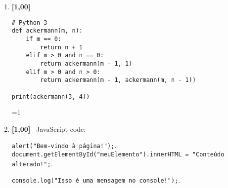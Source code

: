 \documentclass[a4paper]{article}
\newcommand{\gabarito}          {0}     %
\newcommand{\pt}                {1,00}  %
\newcommand{\ponto}[1]          {\textbf{[#1]}~}
\begin{document}
\fontsize{9pt}{9pt}\selectfont


\headerP



\begin{adjmulticols}{2}{0pt}{0pt}\raggedcolumns
  
  
\begin{enumerate}[resume=*questions,label={\arabic*.},leftmargin=*]
  \setcounter{rtaskno}{0} %
        
   
  \item \rtask \ponto{\pt} \lipsum[1][1-1]
  
\begin{lstlisting}[style=Python]
# Python 3
def ackermann(m, n):
    if m == 0:
        return n + 1
    elif m > 0 and n == 0:
        return ackermann(m - 1, 1)
    elif m > 0 and n > 0:
        return ackermann(m - 1, ackermann(m, n - 1))

print(ackermann(3, 4))
\end{lstlisting}
  
  {\setlength{\columnsep}{0pt}\renewcommand{\columnseprule}{0pt}
  \begin{multicols}{2}
    \begin{answerlist}[label={\texttt{\Alph*}.},leftmargin=*]
      \ifnum\gabarito=1\doneitem[V.]\else\ti[V.]\fi %
      \ti[F.]
    \end{answerlist}
  \end{multicols}
  }



  \item \rtask \ponto{\pt} \lipsum[1][1-1] JavaScript code:
  
    \begin{answerlist}[label={\texttt{\Alph*}.},leftmargin=*]
      \ti \lstinline[style=JavaScript]|alert("Bem-vindo à página!");|.
      \ti \lstinline[style=JavaScript]|document.getElementById("meuElemento").innerHTML = "Conteúdo alterado!";|.
      
      \di \lstinline[style=JavaScript]|console.log("Isso é uma mensagem no console!");|. %
      

\end{answerlist}
\end{enumerate}
\end{adjmulticols}
\end{document}
